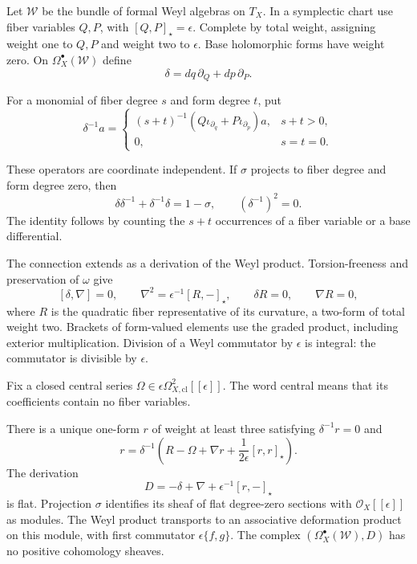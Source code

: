 Let $\mathcal W$ be the bundle of formal Weyl algebras on $T_X$.
In a symplectic chart use fiber variables $Q,P$, with
$[Q,P]_\star=\epsilon$. Complete by total weight, assigning weight
one to $Q,P$ and weight two to $\epsilon$. Base holomorphic forms
have weight zero. On $\Omega_X^\bullet(\mathcal W)$ define
\[
 \delta=dq\,\partial_Q+dp\,\partial_P.
\]

For a monomial of fiber degree $s$ and form degree $t$, put
\[
 \delta^{-1}a=
 \begin{cases}
  (s+t)^{-1}(Q\iota_{\partial_q}+P\iota_{\partial_p})a,
       &s+t>0,\\
  0,&s=t=0.
 \end{cases}
\]

These operators are coordinate independent. If $\sigma$ projects
to fiber degree and form degree zero, then
\begin{equation}\label{mht:eq:fedosov-contraction}
 \delta\delta^{-1}+\delta^{-1}\delta=1-\sigma,
 \qquad (\delta^{-1})^2=0.
\end{equation}
The identity follows by counting the $s+t$ occurrences of a fiber
variable or a base differential.

The connection extends as a derivation of the Weyl product.
Torsion-freeness and preservation of $\omega$ give
\[
 [\delta,\nabla]=0,\qquad
 \nabla^2=\epsilon^{-1}[R,-]_\star,
 \qquad \delta R=0,\qquad\nabla R=0,
\]
where $R$ is the quadratic fiber representative of its curvature,
a two-form of total weight two. Brackets of form-valued elements
use the graded product, including exterior multiplication.
Division of a Weyl commutator by $\epsilon$ is integral: the
commutator is divisible by $\epsilon$.

Fix a closed central series
$\Omega\in\epsilon\Omega^2_{X,\mathrm{cl}}[[\epsilon]]$.
The word central means that its coefficients contain no fiber
variables.

\begin{theorem}\label{mht:thm:holomorphic-fedosov-resolution}
There is a unique one-form $r$ of weight at least three satisfying
$\delta^{-1}r=0$ and
\begin{equation}\label{mht:eq:fedosov-recursion}
 r=\delta^{-1}\left(R-\Omega+\nabla r
                         +\frac1{2\epsilon}[r,r]_\star\right).
\end{equation}
The derivation
\[
 D=-\delta+\nabla+\epsilon^{-1}[r,-]_\star
\]
is flat. Projection $\sigma$ identifies its sheaf of flat
degree-zero sections with $\mathcal O_X[[\epsilon]]$ as modules.
The Weyl product transports to an associative deformation product
on this module, with first commutator $\epsilon\{f,g\}$.
The complex $(\Omega_X^\bullet(\mathcal W),D)$ has no positive
cohomology sheaves.
\end{theorem}

